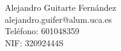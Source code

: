 Alejandro Guitarte Fernández \\ %
alejandro.guifer@alum.uca.es \\ %
Teléfono: 601048359 \\ %
NIF: 32092444S \\ %
